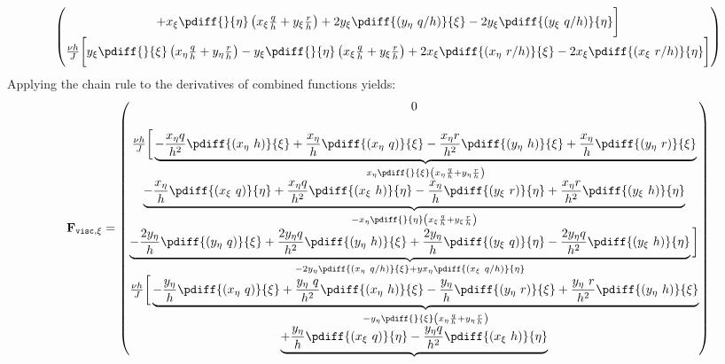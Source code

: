 {{\begin{align}
\begin{pmatrix}
			+ x_{\xi} \pdiff{}{\eta}\left( x_{\xi} \frac{q}{h} + y_{\xi} \frac{r}{h}  \right)
			+ 2 y_{\xi} \pdiff{(y_{\eta}\ q/h)}{\xi}
			- 2 y_{\xi} \pdiff{(y_{\xi}\ q/h)}{\eta} \bigg]
			\\
			\frac{\nu h}{J} \bigg[
			y_{\xi} \pdiff{}{\xi} \left(x_{\eta} \frac{q}{h}
			+ y_{\eta} \frac{r}{h} \right)
			- y_{\xi} \pdiff{}{\eta} \left( x_{\xi} \frac{q}{h} +  y_{\xi} \frac{r}{h} \right)
			+ 2 x_{\xi} \pdiff{(x_{\eta}\ r/h)}{\xi}
			- 2 x_{\xi} \pdiff{(x_{\xi}\ r/h)}{\eta} \bigg]
		\end{pmatrix}
	\end{align}
%
Applying the chain rule to the derivatives of combined functions yields:
%
	\begin{align} \label{eq:Fvisc_transformed_xietasplit_chainrule}
		\mathbf{F}_{\texttt{visc},\xi}=
		\begin{pmatrix}
			0 \\
			\\
			\frac{\nu h}{J} \bigg[
			\underbrace{-\frac{x_{\eta} q}{h^2}\pdiff{(x_{\eta}\ h)}{\xi}
				+ \frac{x_{\eta}}{h} \pdiff{(x_{\eta}\ q)}{\xi}
				- \frac{x_{\eta}r}{h^2} \pdiff{(y_{\eta}\ h)}{\xi}
				+ \frac{x_{\eta}}{h} \pdiff{(y_{\eta}\ r)}{\xi}}_{x_{\eta} \pdiff{}{\xi}\left( x_{\eta}\frac{q}{h} + y_{\eta}\frac{r}{h}  \right)}\\
			\underbrace{- \frac{x_{\eta} }{h} \pdiff{(x_{\xi}\ q)}{\eta}
				+ \frac{x_{\eta} q}{h^2} \pdiff{ (x_{\xi}\ h)}{\eta}
				- \frac{x_{\eta} }{h} \pdiff{(y_{\xi}\ r)}{\eta}
				+ \frac{x_{\eta} r}{h^2} \pdiff{ (y_{\xi}\ h)}{\eta}}_{ - x_{\eta} \pdiff{}{\eta}\left( x_{\xi} \frac{q}{h} + y_{\xi} \frac{r}{h}  \right)}\\
			\underbrace{- \frac{2 y_{\eta}}{h}  \pdiff{ (y_{\eta}\ q)}{\xi}
				+ \frac{2 y_{\eta} q }{h^2}  \pdiff{ (y_{\eta}\ h)}{\xi}
				+ \frac{2 y_{\eta}}{h}  \pdiff{(y_{\xi}\ q)}{\eta}
				- \frac{2 y_{\eta} q}{h^2} \pdiff{(y_{\xi}\ h)}{\eta}}_{        - 2 y_{\eta} \pdiff{(x_{\eta}\ q/h)}{\xi}
				+ y x_{\eta}  \pdiff{(x_{\xi}\ q/h)}{\eta}}\bigg]\\
			\frac{\nu h}{J} \bigg[
			\underbrace{- \frac{y_{\eta}}{h} \pdiff{(x_{\eta}\ q)}{\xi}
				+ \frac{y_{\eta}\ q }{h^2} \pdiff{(x_{\eta}\ h)}{\xi}
				- \frac{y_{\eta}}{h} \pdiff{(y_{\eta}\ r)}{\xi}
				+ \frac{y_{\eta}\ r }{h^2} \pdiff{(y_{\eta}\ h)}{\xi}}_{-y_{\eta} \pdiff{}{\xi} \left(
				x_{\eta} \frac{q}{h}+ y_{\eta} \frac{r}{h} \right)}\\
			\underbrace{+\frac{y_{\eta}}{h}   \pdiff{(x_{\xi}\ q)}{\eta}
				-\frac{y_{\eta}q}{h^2}   \pdiff{(x_{\xi}\ h)}{\eta}
}
\end{pmatrix}
\end{align}}}
